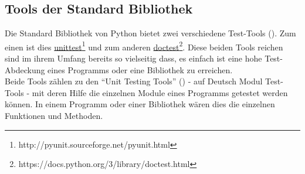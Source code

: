 \subsection{Tools der Standard Bibliothek}\label{python-tools:stdlib}

Die Standard Bibliothek von Python bietet zwei verschiedene Test-Tools (\cite{wiki.python:PythonTestingToolsTaxonomy}).
Zum einen ist dies
\href{http://pyunit.sourceforge.net/pyunit.html}{unittest}\footnote{http://pyunit.sourceforge.net/pyunit.html}
und zum anderen
\href{https://docs.python.org/3/library/doctest.html}{doctest}\footnote{https://docs.python.org/3/library/doctest.html}.
Diese beiden Tools reichen sind im ihrem Umfang bereits so vielseitig dass, es einfach ist eine hohe Test-Abdeckung eines Programms oder eine Bibliothek zu erreichen.
\newline
\\
Beide Tools zählen zu den "`Unit Testing Tools"' (\cite{wiki.python:PythonTestingToolsTaxonomy}) -
auf Deutsch Modul Test-Tools - mit deren Hilfe die einzelnen Module eines Programms
getestet werden können. In einem Programm oder einer Bibliothek wären dies die einzelnen
Funktionen und Methoden.



